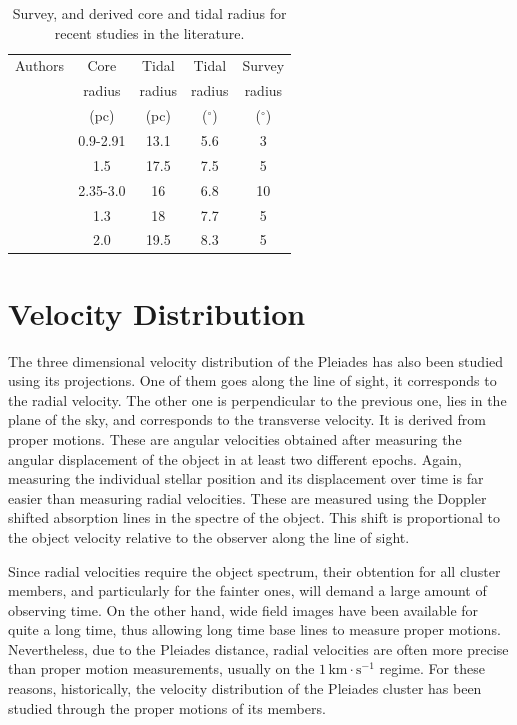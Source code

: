 \begin{table}[ht!]
\caption{Survey, and derived core and tidal radius for recent studies in the literature. }
\begin{center}
\begin{tabular}{ccccc}
Authors &Core&Tidal& Tidal & Survey\\
&radius&radius&radius&radius\\
&(pc)&(pc)&($^\circ$)&($^\circ$)\\
\hline
\citet{Pinfield1998}&0.9-2.91&13.1&5.6&3\\
\citet{Raboud1998}&1.5&17.5&7.5&5\\
\citet{Adams2001}&2.35-3.0&16&6.8&10\\
\citet{Converse2008}&1.3&18&7.7&5\\
\citet{Converse2010}&2.0&19.5&8.3&5\\
\hline
\end{tabular}
\end{center}
\label{tab:tidal_iterature}
\end{table}%

  
\section{Velocity Distribution}

The three dimensional velocity distribution of the Pleiades has also been studied using its projections. One of them goes along the line of sight, it corresponds to the radial velocity. The other one is perpendicular to the previous one, lies in the plane of the sky, and corresponds to the transverse velocity. It is derived from  proper motions. These are angular velocities obtained after measuring the angular displacement of the object in at least two different epochs. Again, measuring the individual stellar position and its displacement over time is far easier than measuring radial velocities. These are measured using the Doppler shifted absorption lines in the spectre of the object. This shift is proportional to the object velocity relative to the observer along the line of sight. 

Since radial velocities require the object spectrum, their obtention for all cluster members, and particularly for the fainter ones, will demand a large amount of observing time. On the other hand, wide field images have been available for quite a long time, thus allowing long time base lines to measure proper motions.  Nevertheless, due to the Pleiades distance, radial velocities are often more precise than proper motion measurements, usually on the $1 \,\mathrm{km\cdot s^{-1}}$ regime. For these reasons, historically, the velocity distribution of the Pleiades cluster has been studied through the proper motions of its members. 

